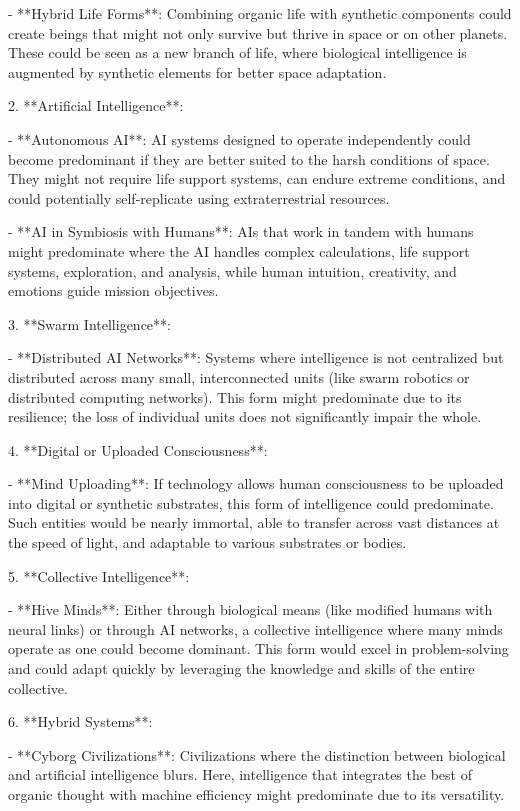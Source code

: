 \documentclass[10pt,titlepage]{book}
\begin{document}
   - **Hybrid Life Forms**: Combining organic life with synthetic components could create beings that might not only survive but thrive in space or on other planets. These could be seen as a new branch of life, where biological intelligence is augmented by synthetic elements for better space adaptation.

2. **Artificial Intelligence**:

   - **Autonomous AI**: AI systems designed to operate independently could become predominant if they are better suited to the harsh conditions of space. They might not require life support systems, can endure extreme conditions, and could potentially self-replicate using extraterrestrial resources.

   - **AI in Symbiosis with Humans**: AIs that work in tandem with humans might predominate where the AI handles complex calculations, life support systems, exploration, and analysis, while human intuition, creativity, and emotions guide mission objectives.

3. **Swarm Intelligence**:

   - **Distributed AI Networks**: Systems where intelligence is not centralized but distributed across many small, interconnected units (like swarm robotics or distributed computing networks). This form might predominate due to its resilience; the loss of individual units does not significantly impair the whole.

4. **Digital or Uploaded Consciousness**:

   - **Mind Uploading**: If technology allows human consciousness to be uploaded into digital or synthetic substrates, this form of intelligence could predominate. Such entities would be nearly immortal, able to transfer across vast distances at the speed of light, and adaptable to various substrates or bodies.

5. **Collective Intelligence**:

   - **Hive Minds**: Either through biological means (like modified humans with neural links) or through AI networks, a collective intelligence where many minds operate as one could become dominant. This form would excel in problem-solving and could adapt quickly by leveraging the knowledge and skills of the entire collective.

6. **Hybrid Systems**:

   - **Cyborg Civilizations**: Civilizations where the distinction between biological and artificial intelligence blurs. Here, intelligence that integrates the best of organic thought with machine efficiency might predominate due to its versatility.
\end{document}
